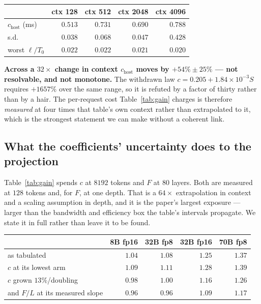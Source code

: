 \begin{center}\small
\begin{tabular}{lrrrr}
\toprule
 & ctx 128 & ctx 512 & ctx 2048 & ctx 4096 \\
\midrule
$c_{\mathrm{host}}$ (ms) & $0.513$ & $0.731$ & $0.690$ & $0.788$ \\
s.d. & $0.038$ & $0.068$ & $0.047$ & $0.428$ \\
worst $\ell/T_0$ & $0.022$ & $0.022$ & $0.021$ & $0.020$ \\
\bottomrule
\end{tabular}
\end{center}

\textbf{Across a $32\times$ change in context $c_{\mathrm{host}}$ moves by
$+54\% \pm 25\%$ --- not resolvable, and not monotone.} The withdrawn law
$c = 0.205 + 1.84{\times}10^{-3}S$ requires $+1657\%$ over the same range, so it is
refuted by a factor of thirty rather than by a hair. The per-request cost
Table~\ref{tab:gain} charges is therefore \emph{measured} at four times that
table's own context rather than extrapolated to it, which is the strongest
statement we can make without a coherent link.

\subsection{What the coefficients' uncertainty does to the projection}
\label{sec:eval:sens}

Table~\ref{tab:gain} spends $c$ at $8192$ tokens and $F$ at $80$ layers. Both are
measured at $128$ tokens and, for $F$, at one depth. That is a $64\times$
extrapolation in context and a scaling assumption in depth, and it is the paper's
largest exposure --- larger than the bandwidth and efficiency box the table's
intervals propagate. We state it in full rather than leave it to be found.

\begin{center}\small
\begin{tabular}{lrrrr}
\toprule
 & 8B fp16 & 32B fp8 & 32B fp16 & 70B fp8 \\
\midrule
as tabulated & $1.04$ & $1.08$ & $\mathbf{1.25}$ & $\mathbf{1.37}$ \\
$c$ at its lowest arm & $1.09$ & $1.11$ & $1.28$ & $1.39$ \\
$c$ grown $13\%$/doubling & $0.98$ & $1.00$ & $1.16$ & $1.26$ \\
and $F/L$ at its measured slope & $0.96$ & $0.96$ & $1.09$ & $1.17$ \\
\bottomrule
\end{tabular}
\end{center}

